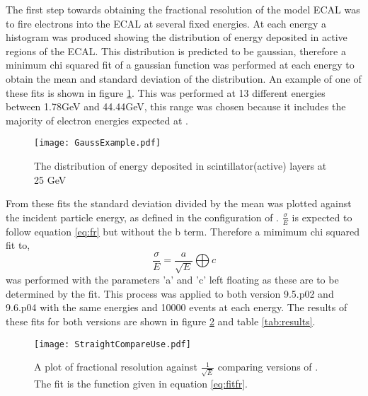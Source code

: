 The first step towards obtaining the fractional resolution of the model ECAL was to fire electrons into the ECAL at several fixed energies.  At each energy a histogram was produced showing the distribution of energy deposited in active regions of the ECAL.  This distribution is predicted to be gaussian, therefore a minimum chi squared fit of a gaussian function was performed at each energy to obtain the mean and standard deviation of the distribution. An example of one of these fits is shown in figure \ref{fig:Gauss}.  This was performed at 13 different energies between 1.78GeV and 44.44GeV, this range was chosen because it includes the majority of electron energies expected at \lhcb.

\begin{figure}[h]
  \centering
  \texttt{[image: GaussExample.pdf]}
  \caption{The distribution of energy deposited in scintillator(active) layers at 25 GeV}
  \label{fig:Gauss}
\end{figure}

From these fits the standard deviation divided by the mean was plotted against the incident particle energy, as defined in the configuration of \geant.  $\frac{\sigma}{E}$ is expected to follow equation \ref{eq:fr} but without the b term. Therefore a mimimum chi squared fit to,
\begin{equation}
  \label{eq:fitfr}
  \frac{\sigma}{E}=\frac{a}{\sqrt{E}}\bigoplus c
\end{equation}
was performed with the parameters 'a' and 'c' left floating as these are to be determined by the fit.  This process was applied to both \geant version 9.5.p02 and 9.6.p04 with the same energies and 10000 events at each energy.  The results of these fits for both \geant versions are shown in figure \ref{fig:straightres} and table \ref{tab:results}.
\begin{figure}[h]
  \centering
  \texttt{[image: StraightCompareUse.pdf]}
  \caption{A plot of fractional resolution against $\frac{1}{\sqrt{E}}$ comparing versions of \geant. The fit is the function given in equation \ref{eq:fitfr}.}
  \label{fig:straightres}
\end{figure}

